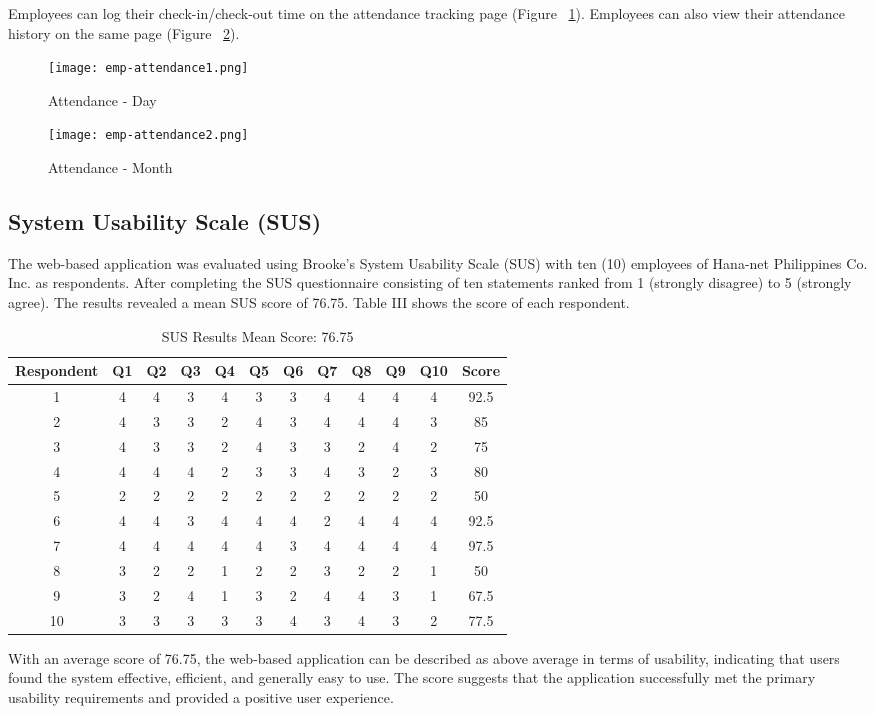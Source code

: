 \documentclass[journal]{./IEEE/IEEEtran}
\begin{document}
Employees can log their check-in/check-out time on the attendance tracking page (Figure ~\ref{fig:emp-attndnce1}). Employees can also view their attendance history on the same page (Figure ~\ref{fig:emp-attndnce2}).
\begin{figure}[H]
    \centering
    \texttt{[image: emp-attendance1.png]}
    \caption{Attendance - Day }

        \label{fig:emp-attndnce1}
\end{figure}
\begin{figure}[H]
        \centering
        \texttt{[image: emp-attendance2.png]}
        \caption{Attendance - Month}
        \label{fig:emp-attndnce2}
    \end{figure}

\subsection{\textbf{System Usability Scale (SUS)}}
The web-based application was evaluated using Brooke's System Usability Scale (SUS) with ten (10) employees of Hana-net Philippines Co. Inc. as respondents. After completing the SUS questionnaire consisting of ten statements ranked from 1 (strongly disagree) to 5 (strongly agree). The results revealed a mean SUS score of 76.75. Table III shows the score of each respondent.\\
\begin{table}[H]
\centering
\small
\setlength{\tabcolsep}{3pt} 
\begin{tabular}{|c |c |c |c |c |c |c |c |c |c |c |c|} \hline 
Respondent & Q1 & Q2 & Q3 & Q4 & Q5 & Q6 & Q7 & Q8 & Q9 & Q10 & Score \\ \hline 
1 & 4 & 4 & 3 & 4 & 3 & 3 & 4 & 4 & 4 & 4 & 92.5 \\ \hline 
2 & 4 & 3 & 3 & 2 & 4 & 3 & 4 & 4 & 4 & 3 & 85 \\ \hline 
3 & 4 & 3 & 3 & 2 & 4 & 3 & 3 & 2 & 4 & 2 & 75 \\ \hline 
4 & 4 & 4 & 4 & 2 & 3 & 3 & 4 & 3 & 2 & 3 & 80 \\ \hline 
5 & 2 & 2 & 2 & 2 & 2 & 2 & 2 & 2 & 2 & 2 & 50 \\ \hline 
6 & 4 & 4 & 3 & 4 & 4 & 4 & 2 & 4 & 4 & 4 & 92.5 \\ \hline 
7 & 4 & 4 & 4 & 4 & 4 & 3 & 4 & 4 & 4 & 4 & 97.5 \\ \hline 
8 & 3 & 2 & 2 & 1 & 2 & 2 & 3 & 2 & 2 & 1 & 50 \\ \hline 
9 & 3 & 2 & 4 & 1 & 3 & 2 & 4 & 4 & 3 & 1 & 67.5 \\ \hline 
10 & 3 & 3 & 3 & 3 & 3 & 4 & 3 & 4 & 3 & 2 & 77.5 \\ \hline

\end{tabular}
\caption{SUS Results
Mean Score: 76.75}
\label{tab:my_table}
\end{table}
With an average score of 76.75, the web-based application can be described as above average in terms of usability, indicating that users found the system effective, efficient, and generally easy to use. The score suggests that the application successfully met the primary usability requirements and provided a positive user experience.
\end{document}
